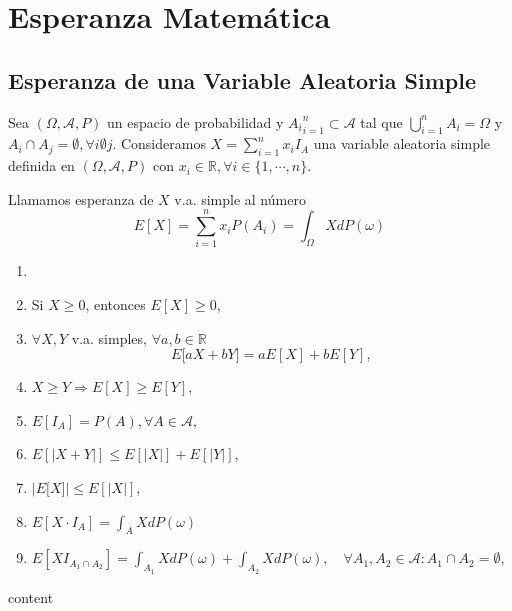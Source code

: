\chapter{Esperanza Matemática}

\section{Esperanza de una Variable Aleatoria Simple}

Sea $(\Omega, \mathcal{A}, P )$ un espacio de probabilidad y ${ A_{i} }_{i = 1}^{n} \subset \mathcal{A}$ tal que $\bigcup_{i = 1}^{n} A_{i} = \Omega$ y $A_{i} \cap A_{j} = \emptyset, \forall i \emptyset j$. Consideramos $X = \sum_{i = 1}^{n} x_{i} I_{A}$ una variable aleatoria simple definida en $(\Omega, \mathcal{A}, P )$ con $x_{i} \in \mathbb{R}, \forall i \in \{ 1, \cdots, n \}$.

\begin{defn}
  Llamamos esperanza de $X$ v.a. simple al número
  \[ 
    E[X] = \sum_{i = 1}^{ n} x_{i} P(A_{i}) = \int_{\Omega}^{} X dP(\omega)
  \] 
\end{defn}

\begin{prop}[Propiedades]
  \begin{enumerate}[label=(\roman*)]
    \item []
    \item Si $X \geq 0$, entonces $E[X] \geq 0$,
    \item $\forall X, Y$ v.a. simples, $\forall a, b \in \mathbb{R}$
      \[ 
      E \big[ aX + bY \big] = aE[X] + bE[Y],
      \] 
    \item $X \geq Y \Rightarrow E[X] \geq E[Y]$,
    \item $E[I_A] = P(A), \forall A \in \mathcal{A}$,
    \item $E[| X + Y |] \leq E[| X |] + E[| Y |]$,
    \item $| E \big[ X \big] | \leq E [ | X | ]$,
    \item $E[X \cdot I_{A}] = \int_{A}^{} X dP(\omega)$
    \item $E [ X I_{A_{1} \cap A_{2}} ] = \int_{A_{1}}^{} X dP(\omega) + \int_{A_{2}}^{} X dP(\omega), \quad \forall A_{1}, A_{2} \in \mathcal{A} : A_{1} \cap A_{2} = \emptyset$,
  \end{enumerate}
\end{prop}

\begin{dem}
  content
\end{dem}

